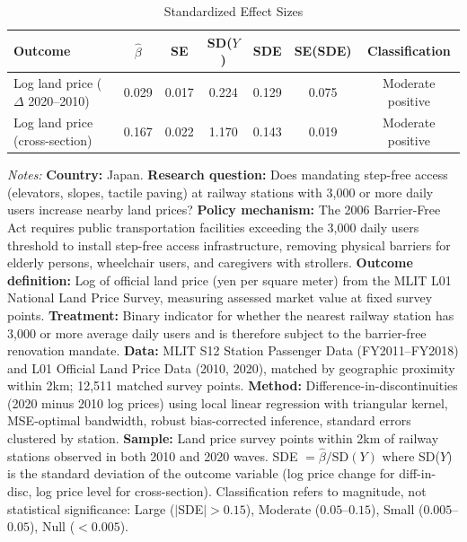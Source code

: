 \begin{table}[t]
\centering
\caption{Standardized Effect Sizes}
\label{tab:sde}
\small
\begin{tabular}{lcccccc}
\hline\hline
Outcome & $\hat{\beta}$ & SE & SD($Y$) & SDE & SE(SDE) & Classification \\
\hline
Log land price ($\Delta$ 2020--2010) & 0.029 & 0.017 & 0.224 & 0.129 & 0.075 & Moderate positive \\
Log land price (cross-section) & 0.167 & 0.022 & 1.170 & 0.143 & 0.019 & Moderate positive \\
\hline\hline
\end{tabular}
\begin{tablenotes}
\item \textit{Notes:} \textbf{Country:} Japan. \textbf{Research question:} Does mandating step-free access (elevators, slopes, tactile paving) at railway stations with 3,000 or more daily users increase nearby land prices? \textbf{Policy mechanism:} The 2006 Barrier-Free Act requires public transportation facilities exceeding the 3,000 daily users threshold to install step-free access infrastructure, removing physical barriers for elderly persons, wheelchair users, and caregivers with strollers. \textbf{Outcome definition:} Log of official land price (yen per square meter) from the MLIT L01 National Land Price Survey, measuring assessed market value at fixed survey points. \textbf{Treatment:} Binary indicator for whether the nearest railway station has 3,000 or more average daily users and is therefore subject to the barrier-free renovation mandate. \textbf{Data:} MLIT S12 Station Passenger Data (FY2011--FY2018) and L01 Official Land Price Data (2010, 2020), matched by geographic proximity within 2km; 12,511 matched survey points. \textbf{Method:} Difference-in-discontinuities (2020 minus 2010 log prices) using local linear regression with triangular kernel, MSE-optimal bandwidth, robust bias-corrected inference, standard errors clustered by station. \textbf{Sample:} Land price survey points within 2km of railway stations observed in both 2010 and 2020 waves. SDE $= \hat{\beta} / \text{SD}(Y)$ where SD($Y$) is the standard deviation of the outcome variable (log price change for diff-in-disc, log price level for cross-section). Classification refers to magnitude, not statistical significance: Large ($|$SDE$| > 0.15$), Moderate ($0.05$--$0.15$), Small ($0.005$--$0.05$), Null ($< 0.005$).
\end{tablenotes}
\end{table}

